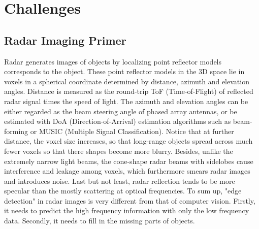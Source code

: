 \section{Challenges} \label{challenges}

\subsection{Radar Imaging Primer}
Radar generates images of objects by localizing point reflector models corresponds to the object. These point reflector models in the 3D space lie in voxels in a spherical coordinate determined by distance, azimuth and elevation angles. Distance is measured as the round-trip ToF (Time-of-Flight) of reflected radar signal times the speed of light. The azimuth and elevation angles can be either regarded as the beam steering angle of phased array antennas, or be estimated with DoA (Direction-of-Arrival) estimation algorithms such as beam-forming or MUSIC (Multiple Signal Classification). Notice that at further distance, the voxel size increases, so that long-range objects spread across much fewer voxels so that there shapes become more blurry. Besides, unlike the extremely narrow light beams, the cone-shape radar beams with sidelobes cause interference and leakage among voxels, which furthermore smears radar images and introduces noise. Last but not least, radar reflection tends to be more specular than the mostly scattering at optical frequencies. To sum up, "edge detection" in radar images is very different from that of computer vision. Firstly, it needs to predict the high frequency information with only the low frequency data. Secondly, it needs to fill in the missing parts of objects. 


